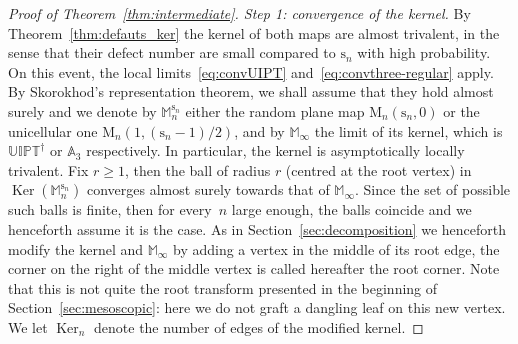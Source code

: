 \documentclass[10pt]{amsart}
\theoremstyle{plain}
\theoremstyle{definition}
\theoremstyle{remark}
\newcommand{\Map}{\mathrm{M}}
\newcommand{\Mapb}{\mathbb{M}}
\newcommand{\spar}{\mathrm{s}}
\DeclareMathOperator{\Ker}{Ker}
\begin{document}
\begin{proof}[Proof of Theorem~\ref{thm:intermediate}. Step 1: convergence of the kernel]
By Theorem~\ref{thm:defauts_ker} the kernel of both maps are almost trivalent, in the sense that their defect number are small compared to $\spar_n$ with high probability. On this event, the local limits~\eqref{eq:convUIPT} and~\eqref{eq:convthree-regular} apply. By \eg Skorokhod's representation theorem, we shall assume that they hold almost surely and we denote by $\Mapb_n^{\spar_n}$ either the random plane map $\Map_{n}(\spar_{n},0)$ or the unicellular one $\Map_{n}(1, (\spar_{n}-1)/2)$, and by $\Mapb_\infty$ the limit of its kernel, which is $\mathbb{UIPT}^\dagger$ or $\mathbb{A}_3$ respectively. In particular, the kernel is asymptotically locally trivalent.
Fix $r \ge1$, then the ball of radius $r$ (centred at the root vertex) in $\Ker(\Mapb_n^{\spar_n})$ converges almost surely towards that of $\Mapb_\infty$. Since the set of possible such balls is finite, then for \hbox{every}~$n$ large enough, the balls coincide and we henceforth assume it is the case. As in Section~\ref{sec:decomposition} we henceforth modify the kernel and $\Mapb_\infty$ by adding a vertex in the middle of its root edge, the corner on the right of the middle vertex is called hereafter the root corner. Note that this is not quite the root transform presented in the beginning of Section~\ref{sec:mesoscopic}: here we do not graft a dangling leaf on this new vertex.
We let $\Ker_n$ denote the number of edges of the modified kernel.


\end{proof}
\end{document}
